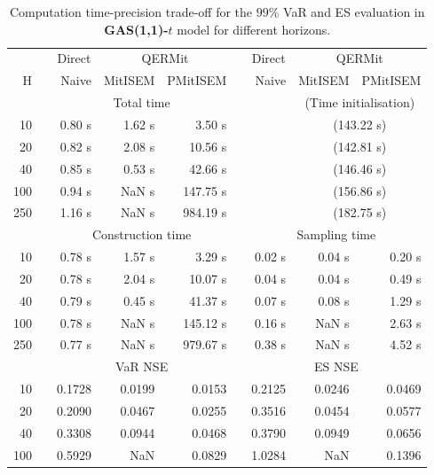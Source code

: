\footnotesize{  
{ \renewcommand{\arraystretch}{1.3} 
\begin{longtable}{rr rrr r rrr}  
\caption{Computation time-precision trade-off for the  $99\%$ VaR and ES evaluation in \textbf{GAS(1,1)-$t$} model for different horizons.} 
\label{tab:time_precision_t_gas_ML} \\ 
 & & \multicolumn{1}{c}{Direct} & \multicolumn{2}{c}{QERMit}&  & \multicolumn{1}{c}{Direct} & \multicolumn{2}{c}{QERMit} \\ \cline{3-5} \cline{7-9} 
 H & & Naive & MitISEM & PMitISEM & & Naive & MitISEM & PMitISEM \\ \hline 
 & & \multicolumn{3}{c}{Total time} & & & \multicolumn{2}{c}{(Time initialisation)}  \\ \cline{3-5} \cline{8-9}
10 & & 0.80 s & 1.62 s & 3.50 s &&& \multicolumn{2}{c}{(143.22 s)} \\ 
20 & & 0.82 s & 2.08 s & 10.56 s &&& \multicolumn{2}{c}{(142.81 s)} \\ 
40 & & 0.85 s & 0.53 s & 42.66 s &&& \multicolumn{2}{c}{(146.46 s)} \\ 
100 & & 0.94 s &  NaN s & 147.75 s &&& \multicolumn{2}{c}{(156.86 s)} \\ 
250 & & 1.16 s &  NaN s & 984.19 s &&& \multicolumn{2}{c}{(182.75 s)} \\ 
\hline 
 & & \multicolumn{3}{c}{Construction time} & & \multicolumn{3}{c}{ Sampling time} \\ \cline{3-5}  \cline{7-9}
10 & & 0.78 s & 1.57 s & 3.29 s &&  0.02 s & 0.04 s & 0.20 s \\ 
20 & & 0.78 s & 2.04 s & 10.07 s &&  0.04 s & 0.04 s & 0.49 s \\ 
40 & & 0.79 s & 0.45 s & 41.37 s &&  0.07 s & 0.08 s & 1.29 s \\ 
100 & & 0.78 s &  NaN s & 145.12 s &&  0.16 s &  NaN s & 2.63 s \\ 
250 & & 0.77 s &  NaN s & 979.67 s &&  0.38 s &  NaN s & 4.52 s \\ 
\hline 
 & & \multicolumn{3}{c}{VaR NSE} &&  \multicolumn{3}{c}{ES NSE} \\ \cline{3-5}  \cline{7-9}
10 && 0.1728  & 0.0199  & 0.0153 && 0.2125  & 0.0246  & 0.0469  \\ 
20 && 0.2090  & 0.0467  & 0.0255 && 0.3516  & 0.0454  & 0.0577  \\ 
40 && 0.3308  & 0.0944  & 0.0468 && 0.3790  & 0.0949  & 0.0656  \\ 
100 && 0.5929  &    NaN  & 0.0829 && 1.0284  &    NaN  & 0.1396  \\ 

\end{longtable}}}

